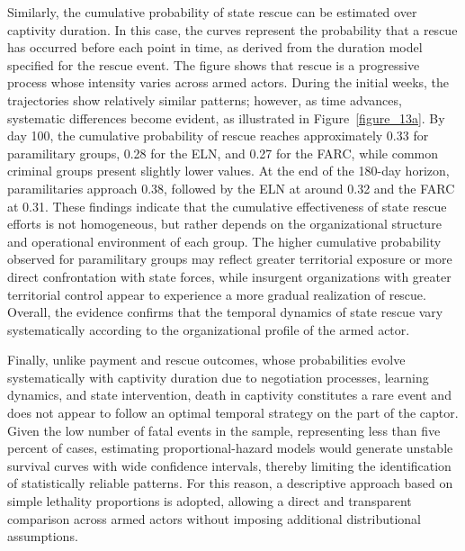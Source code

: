 \documentclass[12pt,a4paper]{article}
\theoremstyle{plain}
\theoremstyle{definition}
\theoremstyle{remark}
\newcommand{\1}{\mathbf{1}}
\begin{document}
Similarly, the cumulative probability of state rescue can be estimated over captivity duration. In this case, the curves represent the probability that a rescue has occurred before each point in time, as derived from the duration model specified for the rescue event. The figure shows that rescue is a progressive process whose intensity varies across armed actors. During the initial weeks, the trajectories show relatively similar patterns; however, as time advances, systematic differences become evident, as illustrated in Figure~\ref{figure_13a}. By day 100, the cumulative probability of rescue reaches approximately 0.33 for paramilitary groups, 0.28 for the ELN, and 0.27 for the FARC, while common criminal groups present slightly lower values. At the end of the 180-day horizon, paramilitaries approach 0.38, followed by the ELN at around 0.32 and the FARC at 0.31. These findings indicate that the cumulative effectiveness of state rescue efforts is not homogeneous, but rather depends on the organizational structure and operational environment of each group. The higher cumulative probability observed for paramilitary groups may reflect greater territorial exposure or more direct confrontation with state forces, while insurgent organizations with greater territorial control appear to experience a more gradual realization of rescue. Overall, the evidence confirms that the temporal dynamics of state rescue vary systematically according to the organizational profile of the armed actor.

Finally, unlike payment and rescue outcomes, whose probabilities evolve systematically with captivity duration due to negotiation processes, learning dynamics, and state intervention, death in captivity constitutes a rare event and does not appear to follow an optimal temporal strategy on the part of the captor. Given the low number of fatal events in the sample, representing less than five percent of cases, estimating proportional-hazard models would generate unstable survival curves with wide confidence intervals, thereby limiting the identification of statistically reliable patterns. For this reason, a descriptive approach based on simple lethality proportions is adopted, allowing a direct and transparent comparison across armed actors without imposing additional distributional assumptions.
\end{document}
